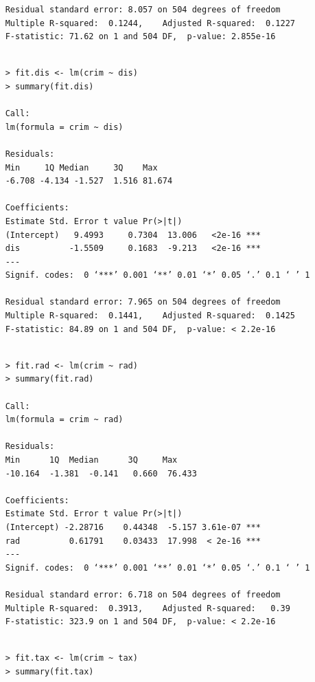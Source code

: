 \documentclass{article}
\begin{document}
\begin{itemize}
\begin{program}
\begin{verbatim}
	Residual standard error: 8.057 on 504 degrees of freedom
	Multiple R-squared:  0.1244,	Adjusted R-squared:  0.1227 
	F-statistic: 71.62 on 1 and 504 DF,  p-value: 2.855e-16
	
	\end{verbatim}
\end{program}

\begin{program}
	\begin{verbatim}
	> fit.dis <- lm(crim ~ dis)
	> summary(fit.dis)
	
	Call:
	lm(formula = crim ~ dis)
	
	Residuals:
	Min     1Q Median     3Q    Max 
	-6.708 -4.134 -1.527  1.516 81.674 
	
	Coefficients:
	Estimate Std. Error t value Pr(>|t|)    
	(Intercept)   9.4993     0.7304  13.006   <2e-16 ***
	dis          -1.5509     0.1683  -9.213   <2e-16 ***
	---
	Signif. codes:  0 ‘***’ 0.001 ‘**’ 0.01 ‘*’ 0.05 ‘.’ 0.1 ‘ ’ 1
	
	Residual standard error: 7.965 on 504 degrees of freedom
	Multiple R-squared:  0.1441,	Adjusted R-squared:  0.1425 
	F-statistic: 84.89 on 1 and 504 DF,  p-value: < 2.2e-16
	
	\end{verbatim}
\end{program}

\begin{program}
	\begin{verbatim}
	> fit.rad <- lm(crim ~ rad)
	> summary(fit.rad)
	
	Call:
	lm(formula = crim ~ rad)
	
	Residuals:
	Min      1Q  Median      3Q     Max 
	-10.164  -1.381  -0.141   0.660  76.433 
	
	Coefficients:
	Estimate Std. Error t value Pr(>|t|)    
	(Intercept) -2.28716    0.44348  -5.157 3.61e-07 ***
	rad          0.61791    0.03433  17.998  < 2e-16 ***
	---
	Signif. codes:  0 ‘***’ 0.001 ‘**’ 0.01 ‘*’ 0.05 ‘.’ 0.1 ‘ ’ 1
	
	Residual standard error: 6.718 on 504 degrees of freedom
	Multiple R-squared:  0.3913,	Adjusted R-squared:   0.39 
	F-statistic: 323.9 on 1 and 504 DF,  p-value: < 2.2e-16
	
	\end{verbatim}
\end{program}

\begin{program}
	\begin{verbatim}
	> fit.tax <- lm(crim ~ tax)
	> summary(fit.tax)
	

\end{verbatim}
\end{program}
\end{itemize}
\end{document}
